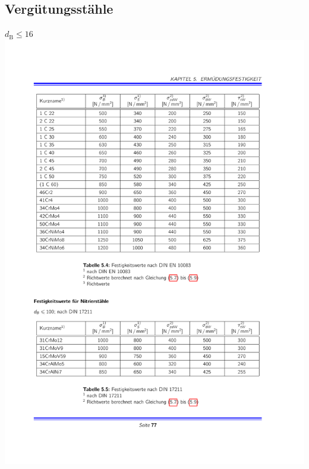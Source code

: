 \begin{multicols}{3}
		\subsection{Vergütungsstähle} %
			\label{verguetungsstaehle}
			$d_{\text{B}} \leq 16$ \\
			\includegraphics[width=\columnwidth]{graphics/verguetungsstaehle}

\end{multicols}
